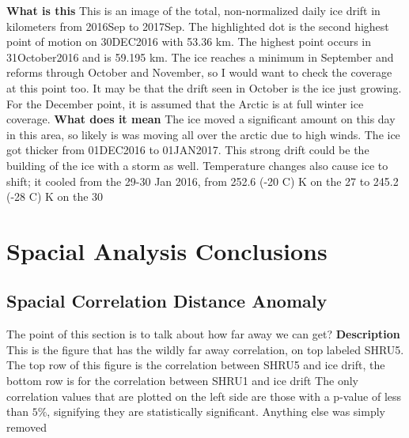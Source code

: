 \textbf{What is this}
This is an image of the total, non-normalized daily ice drift in kilometers from 2016Sep to 2017Sep. The highlighted dot is the second highest point of motion on 30DEC2016 with 53.36 km. The highest point occurs in 31October2016 and is 59.195 km. The ice reaches a minimum in September and reforms through October and November, so I would want to check the coverage at this point too. It may be that the drift seen in October is the ice just growing. For the December point, it is assumed that the Arctic is at full winter ice coverage. 
\textbf{What does it mean}
The ice moved a significant amount on this day in this area, so likely is was moving all over the arctic due to high winds. The ice got thicker from 01DEC2016 to 01JAN2017. This strong drift could be the building of the ice with a storm as well. Temperature changes also cause ice to shift; it cooled from the 29-30 Jan 2016, from 252.6 (-20 C) K on the 27 to 245.2 (-28 C) K on the 30





\section{Spacial Analysis Conclusions} %

%






\subsection{Spacial Correlation Distance Anomaly}   \label{anomaly}  %

The point of this section is to talk about how far away we can get?
\textbf{Description}
This is the figure that has the wildly far away correlation, on top labeled SHRU5. 
The top row of this figure is the correlation between SHRU5 and ice drift, the bottom row is for the correlation between SHRU1 and ice drift
The only correlation values that are plotted on the left side are those with a p-value of less than $5\%$, signifying they are statistically significant. Anything else was simply removed 

